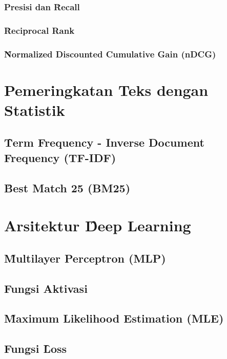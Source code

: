        \subsubsection{Presisi dan \f{Recall}}

        \subsubsection{\f{Reciprocal Rank}}

        \subsubsection{\f{Normalized Discounted Cumulative Gain} (nDCG)}


\section{Pemeringkatan Teks dengan Statistik}
    \subsection{\f{Term Frequency - Inverse Document Frequency} (TF-IDF)}
    \subsection{\f{Best Match 25} (BM25)}


\section{Arsitektur \f{Deep Learning}}

    \subsection{\f{Multilayer Perceptron} (MLP)}

    \subsection{Fungsi Aktivasi}

    \subsection{\f{Maximum Likelihood Estimation} (MLE)}

    \subsection{Fungsi \f{Loss}}
